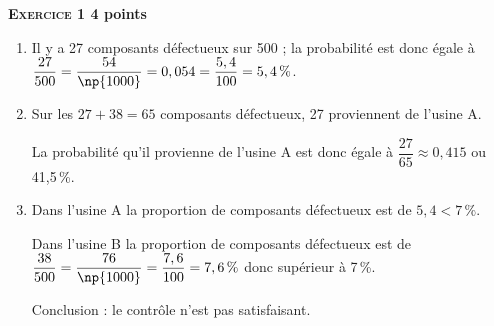 \textbf{\textsc{Exercice 1} \hfill 4 points}

\medskip

%
%
   
\begin{enumerate}
\item %
Il y a 27 composants défectueux sur 500 ; la probabilité est donc égale à $\dfrac{27}{500} = \dfrac{54}{\np{1000}} = 0,054 = \dfrac{5,4}{100} = 5,4\,\%$. 
\item %
Sur les $27 + 38 = 65$ composants défectueux, 27 proviennent de l'usine A.

La probabilité qu'il provienne de l'usine A est donc égale à $\dfrac{27}{65} \approx 0,415$ ou 41,5\,\%.
\item %
Dans l'usine A la proportion de composants défectueux est de $5,4 < 7\,\%$.

Dans l'usine B  la proportion de composants défectueux est de $\dfrac{38}{500} = \dfrac{76}{\np{1000}} = \dfrac{7,6}{100} = 7,6\,\%$ donc supérieur à 7\,\%.

Conclusion : le contrôle n'est pas satisfaisant.
\end{enumerate}

\bigskip

